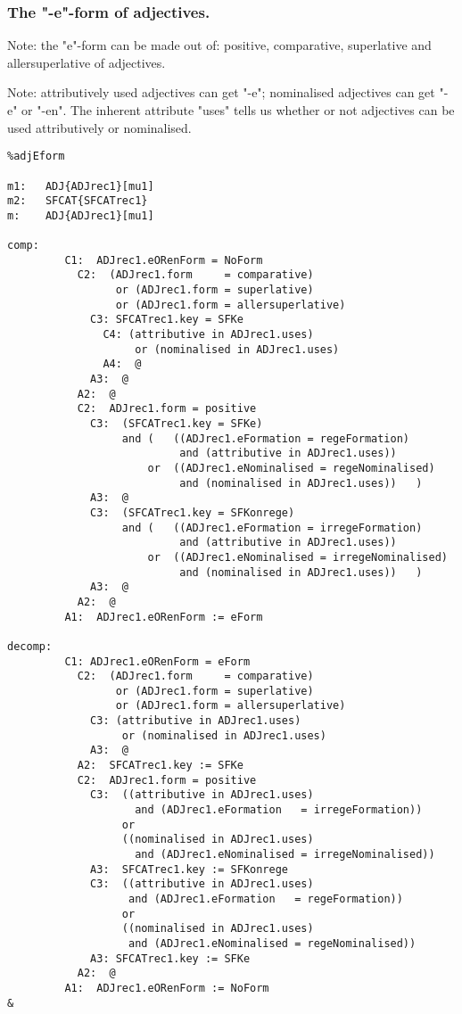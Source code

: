 \subsubsection{The "-e"-form of adjectives.}

Note:  the "e"-form can be made out of: positive, 
   comparative, superlative and allersuperlative of adjectives.

Note: attributively used adjectives can get "-e"; nominalised adjectives can get
      "-e" or "-en". The inherent attribute "uses" tells us whether or not 
      adjectives can be used attributively or nominalised.

\begin{verbatim}
%adjEform

m1:   ADJ{ADJrec1}[mu1]
m2:   SFCAT{SFCATrec1}
m:    ADJ{ADJrec1}[mu1]

comp:    
         C1:  ADJrec1.eORenForm = NoForm
           C2:  (ADJrec1.form     = comparative) 
                 or (ADJrec1.form = superlative) 
                 or (ADJrec1.form = allersuperlative)
             C3: SFCATrec1.key = SFKe
               C4: (attributive in ADJrec1.uses) 
                    or (nominalised in ADJrec1.uses)
               A4:  @
             A3:  @
           A2:  @
           C2:  ADJrec1.form = positive 
             C3:  (SFCATrec1.key = SFKe)
                  and (   ((ADJrec1.eFormation = regeFormation)
                           and (attributive in ADJrec1.uses))
                      or  ((ADJrec1.eNominalised = regeNominalised)
                           and (nominalised in ADJrec1.uses))   )
             A3:  @
             C3:  (SFCATrec1.key = SFKonrege)
                  and (   ((ADJrec1.eFormation = irregeFormation)
                           and (attributive in ADJrec1.uses))
                      or  ((ADJrec1.eNominalised = irregeNominalised)
                           and (nominalised in ADJrec1.uses))   )
             A3:  @
           A2:  @
         A1:  ADJrec1.eORenForm := eForm

decomp:  
         C1: ADJrec1.eORenForm = eForm
           C2:  (ADJrec1.form     = comparative) 
                 or (ADJrec1.form = superlative) 
                 or (ADJrec1.form = allersuperlative)
             C3: (attributive in ADJrec1.uses) 
                  or (nominalised in ADJrec1.uses) 
             A3:  @
           A2:  SFCATrec1.key := SFKe
           C2:  ADJrec1.form = positive 
             C3:  ((attributive in ADJrec1.uses) 
                    and (ADJrec1.eFormation   = irregeFormation))
                  or
                  ((nominalised in ADJrec1.uses) 
                    and (ADJrec1.eNominalised = irregeNominalised))
             A3:  SFCATrec1.key := SFKonrege
             C3:  ((attributive in ADJrec1.uses) 
                   and (ADJrec1.eFormation   = regeFormation))
                  or
                  ((nominalised in ADJrec1.uses)
                   and (ADJrec1.eNominalised = regeNominalised))
             A3: SFCATrec1.key := SFKe 
           A2:  @
         A1:  ADJrec1.eORenForm := NoForm
&
\end{verbatim}
\newpage
